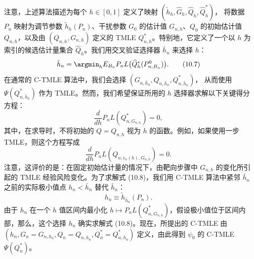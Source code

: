 注意，上述算法描述为每个 $h\in[0,1]$ 定义了映射
$(\tilde h_h,\widehat G_h,\widehat Q_h,\widehat Q_h^*)$，
将数据 $P_n$ 映射为调节参数 $\tilde h_h(P_n)$、干扰参数 $G_0$ 的估计值 $G_{n,h}$、$Q_0$ 的初始估计值 $Q_{n,h}$，以及由 $(Q_{n,h},G_{n,h})$ 定义的 TMLE $Q_{n,h}^*$。特别地，它定义了一个以 $h$ 为索引的候选估计量集合 $\widehat Q_h$。我们用交叉验证选择器 $\bar h_n$ 来选择 $h$：
\begin{equation}
 \bar h_n
 =\argmin_h E_{B_n}P_nL\bigl(\widehat Q_h^*(P_{n,B_n}^0)\bigr).
 \tag{10.7}
\end{equation}
在通常的 C-TMLE 算法中，我们会选择
$(G_{n,\bar h_n},Q_{n,\bar h_n},Q_{n,\bar h_n}^*)$，
从而使用 $\Psi(Q_{n,\bar h_n}^*)$ 作为 TMLE。然而，我们希望保证所用的 $h$ 选择器求解以下关键得分方程：
\begin{equation}
 \frac{d}{dh}P_nL(Q_{n,G_{n,h}}^*)=0,
 \tag{10.8}
\end{equation}
其中，在求导时，不将初始的 $Q=Q_{n,h}$ 视为 $h$ 的函数。例如，如果使用一步 TMLE，则这个方程写成
\[
 \frac{d}{dh}P_nL(Q_{n,\epsilon_n(h),G_{n,h}})=0.
\]
注意，这评价的是：在固定初始估计量的情况下，由靶向步骤中 $G_{n,h}$ 的变化所引起的 TMLE 经验风险变化。为了求解式 (10.8)，我们用 C-TMLE 算法中紧邻 $\bar h_n$ 之前的实际极小值点 $h_n<\bar h_n$ 替代 $\bar h_n$：
\begin{equation}
 h_n\equiv\tilde h_{\bar h_n}(P_n).
 \tag{10.9}
\end{equation}
由于 $h_n$ 在一个 $h$ 值区间内最小化 $h\mapsto P_nL(Q_{n,G_{n,h}}^*)$，假设极小值位于区间内部，那么，这个选择 $h_n$ 确实求解式 (10.8)。现在，所提出的 C-TMLE 由
$(h_n,G_n=G_{n,h_n},Q_n=Q_{n,h_n},Q_n^*=Q_{n,h_n}^*)$
定义，由此得到 $\psi_0$ 的 C-TMLE $\Psi(Q_n^*)$。

